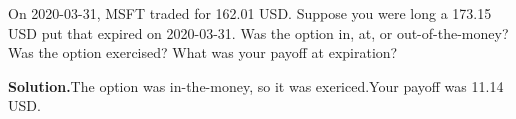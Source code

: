 \noindent On 2020-03-31, MSFT traded for 162.01 USD. Suppose you were long a 173.15 USD put that expired on 2020-03-31. Was the option in, at, or out-of-the-money? Was the option exercised? What was your payoff at expiration?

\vspace{9pt} 

\textbf{Solution.}The option was in-the-money, so it was exericed.Your payoff was 11.14 USD.